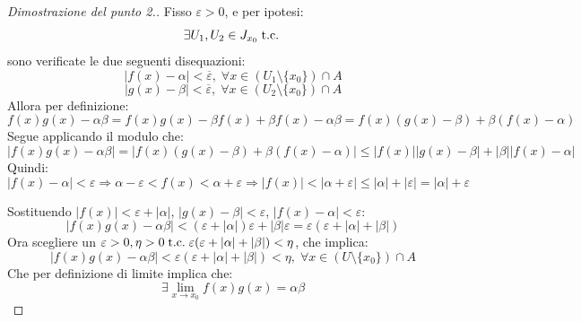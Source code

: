 \documentclass[a4paper,12pt,openright]{book}
\begin{document}
	\begin{proof}[Dimostrazione del punto 2.]
		Fisso $\varepsilon > 0$, e per ipotesi:
		\[\exists U_1, U_2 \in J_{x_0} \;\text{t.c.}\; \]
		sono verificate le due seguenti disequazioni:
		\[|f(x) - \alpha| < \overline{\varepsilon}, \; \forall x \in (U_1 \setminus \{x_0\}) \cap A\]
		\[|g(x) - \beta| < \overline{\varepsilon}, \; \forall x \in (U_2 \setminus \{x_0\}) \cap A\]
		Allora per definizione:
		\[f(x)g(x) - \alpha\beta = f(x)g(x) - \beta f(x) + \beta f(x)- \alpha \beta = f(x)(g(x) - \beta) + \beta(f(x) - \alpha)\]
		Segue applicando il modulo che:
		\[|f(x)g(x) - \alpha\beta| = |f(x)(g(x) - \beta) + \beta(f(x) - \alpha)| \leq |f(x)||g(x) - \beta| + |\beta||f(x) - \alpha|\]
		Quindi:
		\[|f(x) - \alpha| < \varepsilon \Rightarrow \alpha - \varepsilon < f(x) < \alpha + \varepsilon \Rightarrow |f(x)| < |\alpha + \varepsilon| \leq |\alpha| + |\varepsilon| = |\alpha| + \varepsilon\]

		Sostituendo $|f(x)| < \varepsilon + |\alpha|$, $|g(x) - \beta| < \varepsilon$, $|f(x) - \alpha| < \varepsilon$:
		\[|f(x)g(x) - \alpha\beta| < (\varepsilon + |\alpha|)\varepsilon + |\beta|\varepsilon = \varepsilon(\varepsilon + |\alpha| + |\beta|)\]
		Ora scegliere un $\varepsilon > 0, \eta > 0 \;\text{t.c.}\; \varepsilon(\varepsilon + |\alpha| + |\beta|) < \eta$, che implica:
		\[|f(x)g(x) - \alpha\beta| < \varepsilon(\varepsilon + |\alpha| + |\beta|) < \eta,\; \forall x \in (U \setminus \{x_0\}) \cap A\]
		Che per definizione di limite implica che: 
		\[\exists \lim_{x \rightarrow x_0} f(x)g(x) = \alpha\beta\]
	\end{proof}
	
	\newpage
	
\end{document}
